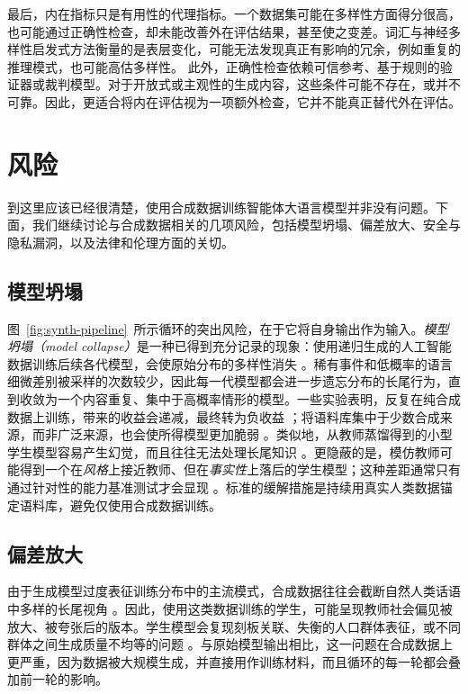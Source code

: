 最后，内在指标只是有用性的代理指标。一个数据集可能在多样性方面得分很高，也可能通过正确性检查，却未能改善外在评估结果，甚至使之变差。词汇与神经多样性启发式方法衡量的是表层变化，可能无法发现真正有影响的冗余，例如重复的推理模式，也可能高估多样性。
此外，正确性检查依赖可信参考、基于规则的验证器或裁判模型。对于开放式或主观性的生成内容，这些条件可能不存在，或并不可靠。因此，更适合将内在评估视为一项额外检查，它并不能真正替代外在评估。




\section{风险}
\label{sec:risks}

到这里应该已经很清楚，使用合成数据训练智能体大语言模型并非没有问题。下面，我们继续讨论与合成数据相关的几项风险，包括模型坍塌、偏差放大、安全与隐私漏洞，以及法律和伦理方面的关切。

\subsection{模型坍塌}
图~\ref{fig:synth-pipeline}~所示循环的突出风险，在于它将自身输出作为输入。{\em 模型坍塌（model collapse）}是一种已得到充分记录的现象：使用递归生成的人工智能数据训练后续各代模型，会使原始分布的多样性消失 \citep{shumailov2024curserecursiontraininggenerated}。稀有事件和低概率的语言细微差别被采样的次数较少，因此每一代模型都会进一步遗忘分布的长尾行为，直到收敛为一个内容重复、集中于高概率情形的模型。一些实验表明，反复在纯合成数据上训练，带来的收益会递减，最终转为负收益 \citep{singh2024beyond}；将语料库集中于少数合成来源，而非广泛来源，也会使所得模型更加脆弱 \citep{schaffelder2025syntheticeggsbasketsimpact}。类似地，从教师蒸馏得到的小型学生模型容易产生幻觉，而且往往无法处理长尾知识 \citep{pmlr-v202-kandpal23a}。更隐蔽的是，模仿教师可能得到一个在{\em 风格}上接近教师、但在{\em 事实性}上落后的学生模型；这种差距通常只有通过针对性的能力基准测试才会显现 \citep{gudibande2023falsepromiseimitatingproprietary}。标准的缓解措施是持续用真实人类数据锚定语料库，避免仅使用合成数据训练。

\subsection{偏差放大}
由于生成模型过度表征训练分布中的主流模式，合成数据往往会截断自然人类话语中多样的长尾视角 \citep{van-der-meer-etal-2024-empirical}。因此，使用这类数据训练的学生，可能呈现教师社会偏见被放大、被夸张后的版本。学生模型会复现刻板关联、失衡的人口群体表征，或不同群体之间生成质量不均等的问题 \citep{gallegos2024bias}。与原始模型输出相比，这一问题在合成数据上更严重，因为数据被大规模生成，并直接用作训练材料，而且循环的每一轮都会叠加前一轮的影响。

